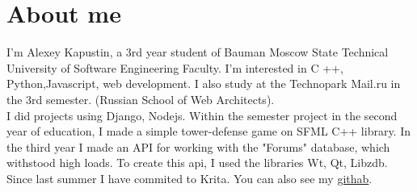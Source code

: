 \documentclass[]{article}
\begin{document}
\section{About me}
I'm Alexey Kapustin, a 3rd year student of Bauman Moscow State Technical University of Software Engineering 
Faculty. I'm interested in C ++, Python,Javascript, web development. I also study at the Technopark Mail.ru in the 3rd semester. (Russian School of Web Architects).
\\ 
I did projects using Django, Nodejs.
Within the semester project in the second year of education, I made a simple tower-defense game on SFML C++ library. In the third year I made an API for working with the "Forums" database, which withstood high loads. To create this api, I used the libraries Wt, Qt, Libzdb.
 Since last summer I have commited  to Krita. You can also see my \href{https://github.com/akapust1n}{githab}.




\end{document}
